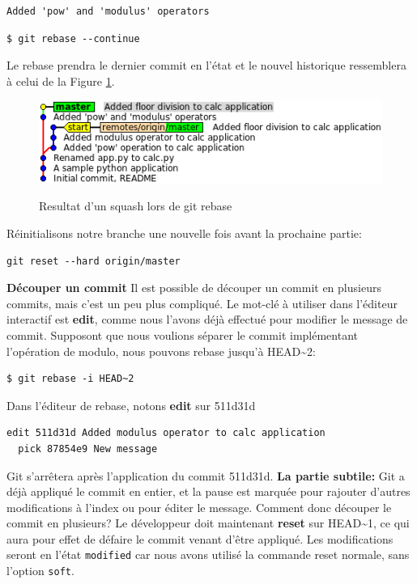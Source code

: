 \documentclass{../../common/tufte-latex/tufte-handout}
\begin{document}
\begin{lstlisting}[style=BashInputStyle]
Added 'pow' and 'modulus' operators
\end{lstlisting}

\begin{lstlisting}[style=BashInputStyle]
  $ git rebase --continue
\end{lstlisting}

Le rebase prendra le dernier commit en l'état et le nouvel historique ressemblera à celui de la Figure \ref{fig:gitrebase-squash}.

\begin{figure}%
  \centering
  \includegraphics[width=0.75\linewidth]{gitrebase-squash.png}
  \label{fig:gitrebase-squash}
  \caption{Resultat d'un squash lors de git rebase}
\end{figure}

Réinitialisons notre branche une nouvelle fois avant la prochaine partie:

\begin{lstlisting}[style=BashInputStyle]
  git reset --hard origin/master
\end{lstlisting}

\noindent \textbf{Découper un commit}
Il est possible de découper un commit en plusieurs commits, mais c'est un peu plus compliqué.
Le mot-clé à utiliser dans l'éditeur interactif est \textbf{edit}, comme nous l'avons déjà effectué pour modifier le message de commit.
Supposont que nous voulions séparer le commit implémentant l'opération de modulo, nous pouvons rebase jusqu'à HEAD\textasciitilde2:

\begin{lstlisting}[style=BashInputStyle]
  $ git rebase -i HEAD~2
\end{lstlisting}

Dans l'éditeur de rebase, notons \textbf{edit} sur 511d31d

\begin{lstlisting}[style=BashInputStyle]
  edit 511d31d Added modulus operator to calc application
  pick 87854e9 New message
\end{lstlisting}

Git s'arrêtera après l'application du commit 511d31d.
\textbf{La partie subtile:} Git a déjà appliqué le commit en entier, et la pause est marquée pour rajouter d'autres modifications à l'index ou pour éditer le message. Comment donc découper le commit en plusieurs?
Le développeur doit maintenant \textbf{reset} sur HEAD\textasciitilde1, ce qui aura pour effet de défaire le commit venant d'être appliqué. Les modifications seront en l'état \texttt{modified} car nous avons utilisé la commande reset normale, sans l'option \texttt{soft}.
\end{document}
